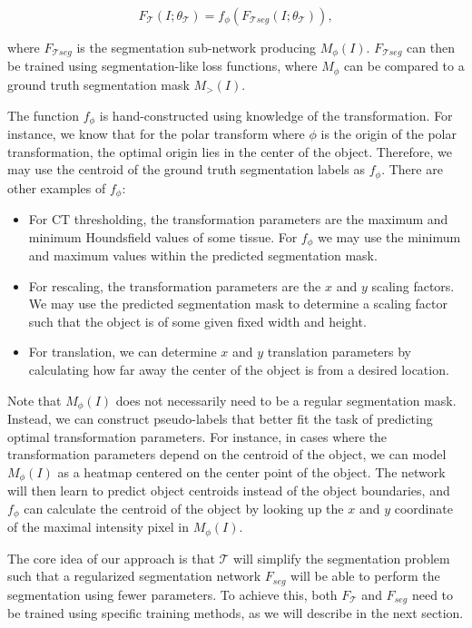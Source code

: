 \begin{equation}
	F_{\mathcal{T}}(I; \theta_{\mathcal{T}}) = f_\phi(F_{\mathcal{T}seg}(I; \theta_{\mathcal{T}})),
\end{equation}

where $F_{\mathcal{T}seg}$ is the segmentation sub-network producing $M_\phi(I)$. $F_{\mathcal{T}seg}$ can then be trained using segmentation-like loss functions, where $M_\phi$ can be compared to a ground truth segmentation mask $M_\gt(I)$. 

The function $f_\phi$ is hand-constructed using knowledge of the transformation. For instance, we know that for the polar transform where $\phi$ is the origin of the polar transformation, the optimal origin lies in the center of the object. Therefore, we may use the centroid of the ground truth segmentation labels as $f_\phi$. There are other examples of $f_\phi$:

\begin{itemize}
	\item For CT thresholding, the transformation parameters are the maximum and minimum Houndsfield values of some tissue. For $f_\phi$ we may use the minimum and maximum values within the predicted segmentation mask.
	\item For rescaling, the transformation parameters are the $x$ and $y$ scaling factors. We may use the predicted segmentation mask to determine a scaling factor such that the object is of some given fixed width and height.
	\item For translation, we can determine $x$ and $y$ translation parameters by calculating how far away the center of the object is from a desired location.
\end{itemize}

Note that $M_\phi(I)$ does not necessarily need to be a regular segmentation mask. Instead, we can construct pseudo-labels that better fit the task of predicting optimal transformation parameters. For instance, in cases where the transformation parameters depend on the centroid of the object, we can model $M_\phi(I)$ as a heatmap centered on the center point of the object. The network will then learn to predict object centroids instead of the object boundaries, and $f_\phi$ can calculate the centroid of the object by looking up the $x$ and $y$ coordinate of the maximal intensity pixel in $M_\phi(I)$.

The core idea of our approach is that $\mathcal{T}$ will simplify the segmentation problem such that a regularized segmentation network $F_{seg}$ will be able to perform the segmentation using fewer parameters. To achieve this, both $F_{\mathcal{T}}$ and $F_{seg}$ need to be trained using specific training methods, as we will describe in the next section.

